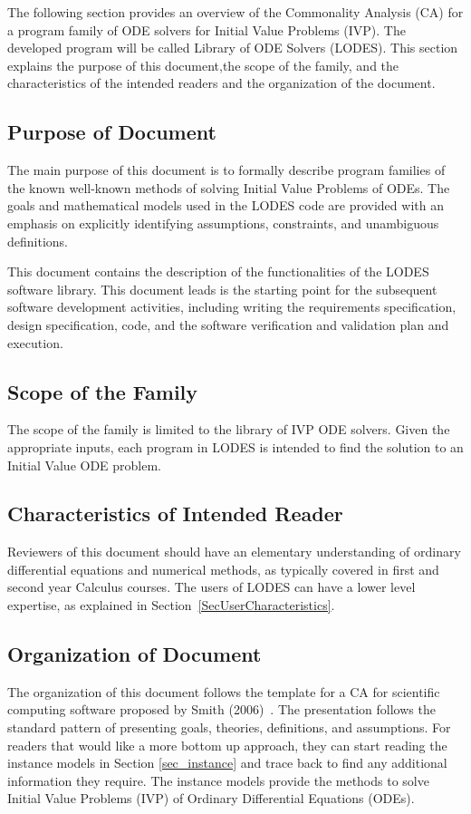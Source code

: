\documentclass[12pt]{article}
\newcommand{\famname}{LODES} %
\newcommand{\famdesc}{Library of ODE Solvers}
\begin{document}
The following section provides an overview of the Commonality Analysis (CA) for a program family of ODE solvers for Initial Value Problems (IVP). The developed program will be
called \famdesc{} (\famname{}). This section explains the purpose of this
document,the scope of the family, and the characteristics of the intended readers
and the organization of the document.

\subsection{Purpose of Document}
The main purpose of this document is to formally describe program families of
the known well-known methods of solving Initial Value Problems of ODEs.
The goals and mathematical models used in the \famname{} code are provided with
an emphasis on explicitly identifying assumptions, constraints, and unambiguous definitions.

This document contains the description of the functionalities of the \famname{} software
library. This document leads is the starting point for the subsequent software development
activities, including writing the requirements specification, design specification, code, and
the software verification and validation plan and execution.

\subsection{Scope of the Family}
The scope of the family is limited to the library of IVP ODE solvers. Given
the appropriate inputs, each program in \famname{} is intended to find the solution to an
Initial Value ODE problem.

\subsection{Characteristics of Intended Reader}
Reviewers of this document should have an elementary understanding of ordinary differential
equations and numerical methods, as typically covered in first and second year Calculus courses.
The users of \famname{} can have a lower level expertise, as explained in
Section~\ref{SecUserCharacteristics}.

\subsection{Organization of Document}
The organization of this document follows the template for a CA for scientific
computing software proposed by Smith (2006)~\cite{Smith2006}. The presentation follows the standard
pattern of presenting goals, theories, definitions, and assumptions. For readers that would
like a more bottom up approach, they can start reading the instance models in Section
\ref{sec_instance} and trace back to find any additional information they require.  The
instance models provide the methods to solve Initial Value Problems (IVP) of Ordinary Differential Equations (ODEs).
\end{document}
